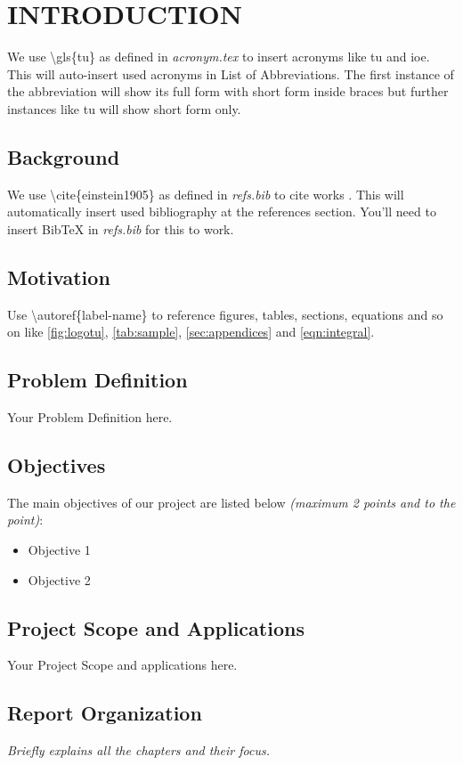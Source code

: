 \section{\MakeUppercase{Introduction}}
    We use \textbackslash gls\{tu\} as defined in \textit{acronym.tex} to insert acronyms like \gls{tu} and \gls{ioe}. This will auto-insert used acronyms in List of Abbreviations. The first instance of the abbreviation will show its full form with short form inside braces but further instances like \gls{tu} will show short form only.
    \subsection{Background}
    We use \textbackslash cite\{einstein1905\} as defined in \textit{refs.bib} to cite works \cite{einstein1905}. This will automatically insert used bibliography at the references section. You'll need to insert BibTeX in \textit{refs.bib} for this to work.
    \subsection{Motivation}
    Use \textbackslash autoref\{label-name\} to reference figures, tables, sections, equations and so on like \autoref{fig:logotu}, \autoref{tab:sample}, \autoref{sec:appendices} and \autoref{eqn:integral}.
    \subsection{Problem Definition}
    Your Problem Definition here.
    \subsection{Objectives}
    The main objectives of our project are listed below \textit{(maximum 2 points and to the point)}:
    \begin{itemize}
        \item Objective 1
        \item Objective 2
    \end{itemize}
    
    \subsection{Project Scope and Applications}
    Your Project Scope and applications here.
    \subsection{Report Organization}
    \textit{Briefly explains all the chapters and their focus.}

    \pagebreak
